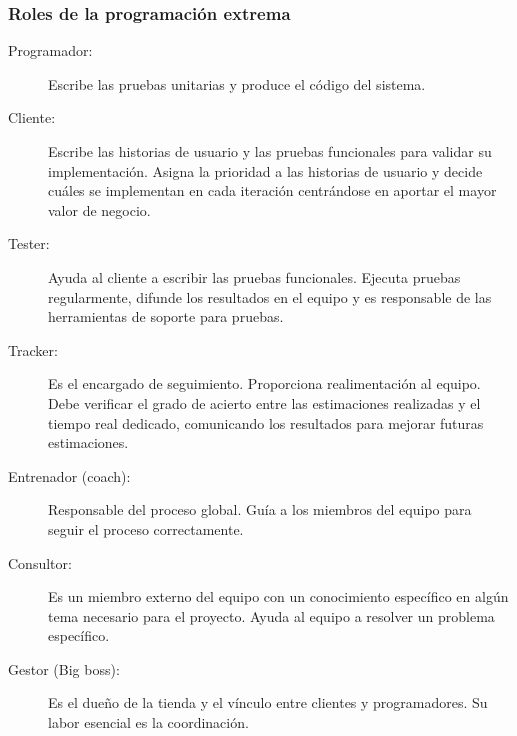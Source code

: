 

      \subsubsection{Roles de la programación extrema}
      \label{subs:roles_xp}

      \begin{description}
        \item[Programador:] Escribe las pruebas unitarias y produce el código del sistema.
        \item[Cliente:] Escribe las historias de usuario y las pruebas funcionales para validar su implementación. Asigna la prioridad a las historias de usuario y decide cuáles se implementan en cada iteración centrándose en aportar el mayor valor de negocio.
        \item[Tester:] Ayuda al cliente a escribir las pruebas funcionales. Ejecuta pruebas regularmente, difunde los resultados en el equipo y es responsable de las herramientas de soporte para pruebas.
        \item[Tracker:] Es el encargado de seguimiento. Proporciona realimentación al equipo. Debe verificar el grado de acierto entre las estimaciones realizadas y el tiempo real dedicado, comunicando los resultados para mejorar futuras estimaciones.
        \item[Entrenador (coach):] Responsable del proceso global. Guía a los miembros del equipo para seguir el proceso correctamente.
        \item[Consultor:] Es un miembro externo del equipo con un conocimiento específico en algún tema necesario para el proyecto. Ayuda al equipo a resolver un problema específico.
        \item[Gestor (Big boss):] Es el dueño de la tienda y el vínculo entre clientes y programadores. Su labor esencial es la coordinación.\cite{xpcyta}
      \end{description}







